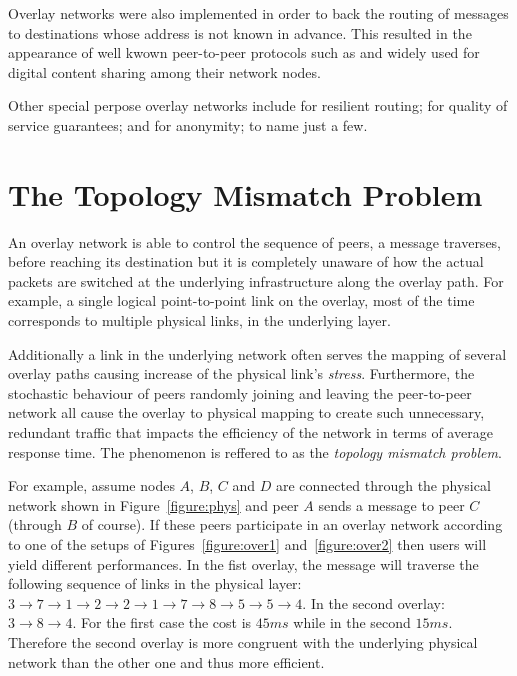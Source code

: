 \documentclass[a4paper,10pt]{article}
\begin{document}
Overlay networks were also implemented in order to back the routing of messages to destinations whose address is not known in advance. This resulted in the appearance of well kwown peer-to-peer protocols such as \cite{gnutella} and \cite{maymounkov_kademlia_2002} widely used for digital content sharing among their network nodes.

Other special perpose overlay networks include \cite{anderson_ron_2001} for resilient routing; \cite{subramanian_overqos_2004} for quality of service guarantees; and \cite{clarke_freenet_2001} for anonymity; to name just a few.

\section{The Topology Mismatch Problem}
An overlay network is able to control the sequence of peers, a message traverses, before reaching its destination but it is completely unaware of how the actual packets are switched at the underlying infrastructure along the overlay path. For example, a single logical point-to-point link on the overlay, most of the time corresponds to multiple physical links, in the underlying layer.

Additionally a link in the underlying network often serves the mapping of several overlay paths causing increase of the physical link's \emph{stress}\cite{chu_esm_2002}.  Furthermore, the stochastic behaviour of peers randomly joining and leaving the peer-to-peer network all cause the overlay to physical mapping to create such unnecessary, redundant traffic that impacts the efficiency of the network in terms of average response time. The phenomenon is reffered to as the \emph{topology mismatch problem}.

For example, assume nodes $A$, $B$, $C$ and $D$ are connected through the physical network shown in Figure~\ref{figure:phys} and peer $A$ sends a message to peer $C$ (through $B$ of course). If these peers participate in an overlay network according to one of the setups of Figures~\ref{figure:over1} and~\ref{figure:over2} then users will yield different performances. In the fist overlay, the message will traverse the following sequence of links in the physical layer: $3 \rightarrow 7 \rightarrow 1 \rightarrow 2 \rightarrow 2 \rightarrow 1 \rightarrow 7 \rightarrow 8 \rightarrow 5 \rightarrow 5 \rightarrow 4$. In the second overlay: $3 \rightarrow 8 \rightarrow 4$. For the first case the cost is $45 ms$ while in the second $15 ms$. Therefore the second overlay is more congruent with the underlying physical network than the other one and thus more efficient.
\end{document}

